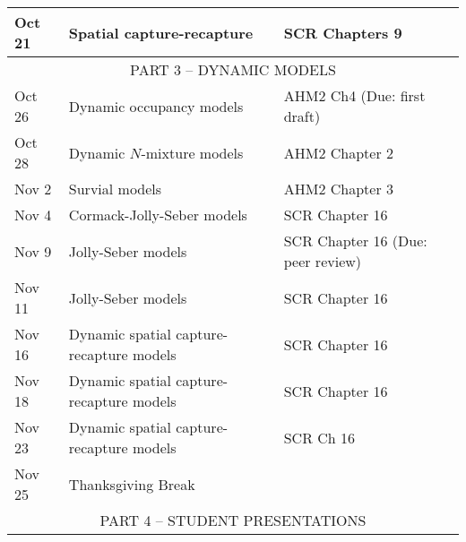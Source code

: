 \documentclass[12pt]{article}
\begin{document}
\begin{center}
\begin{tabular}[c]{lll}
Oct 21     & Spatial capture-recapture                    & SCR Chapters 9                                 \\
\hline
           \multicolumn{3}{c}{PART 3 -- DYNAMIC MODELS}                                                          \\
\hline
Oct 26      & Dynamic occupancy models                     & AHM2 Ch4 (Due: first draft)                          \\
Oct 28      & Dynamic $N$-mixture models                   & AHM2 Chapter 2                                       \\
\hline
Nov 2     & Survial models                               & AHM2 Chapter 3                                       \\
Nov 4     & Cormack-Jolly-Seber models                   & SCR Chapter 16                                       \\
\hline
Nov 9     & Jolly-Seber models                           & SCR Chapter 16 (Due: peer review)                     \\
Nov 11    & Jolly-Seber models                           & SCR Chapter 16                                       \\
\hline
Nov 16     & Dynamic spatial capture-recapture models     & SCR Chapter 16                                       \\
Nov 18     & Dynamic spatial capture-recapture models     & SCR Chapter 16                                       \\
\hline
Nov 23     & Dynamic spatial capture-recapture models     & SCR Ch 16                          \\
Nov 25     & Thanksgiving Break                           &                                                      \\
\hline
           \multicolumn{3}{c}{PART 4 -- STUDENT PRESENTATIONS}                                                   \\

\end{tabular}
\end{center}
\end{document}
